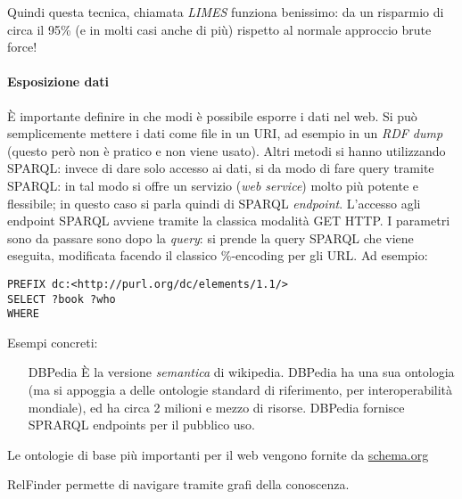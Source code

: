 Quindi questa tecnica, chiamata \textit{LIMES} funziona benissimo: da un risparmio di circa il 95\% (e in molti casi anche di pi\`u) rispetto al normale approccio brute force!

\paragraph*{Esposizione dati}\`E importante definire in che modi \`e possibile esporre i dati nel web. Si pu\`o semplicemente mettere i dati come file in un URI, ad esempio in un \textit{RDF dump} (questo per\`o non \`e pratico e non viene usato). Altri metodi si hanno utilizzando SPARQL: invece di dare solo accesso ai dati, si da modo di fare query tramite SPARQL: in tal modo si offre un servizio (\textit{web service}) molto pi\`u potente e flessibile; in questo caso si parla quindi di SPARQL \textit{endpoint}. L'accesso agli endpoint SPARQL avviene tramite la classica modalit\`a GET HTTP. I parametri sono da passare sono dopo la \textit{query}: si prende la query SPARQL che viene eseguita, modificata facendo il classico \%-encoding per gli URL.
Ad esempio:
\begin{verbatim}
PREFIX dc:<http://purl.org/dc/elements/1.1/>
SELECT ?book ?who
WHERE 
\end{verbatim}

Esempi concreti:
\begin{itemize}
\item[DBPedia] \`E la versione \textit{semantica} di wikipedia. DBPedia ha una sua ontologia (ma si appoggia a delle ontologie standard di riferimento, per interoperabilit\`a mondiale), ed ha circa 2 milioni e mezzo di risorse. DBPedia fornisce SPRARQL endpoints per il pubblico uso.
\end{itemize}

Le ontologie di base pi\`u importanti per il web vengono fornite da \url{schema.org}

RelFinder permette di navigare tramite grafi della conoscenza.
